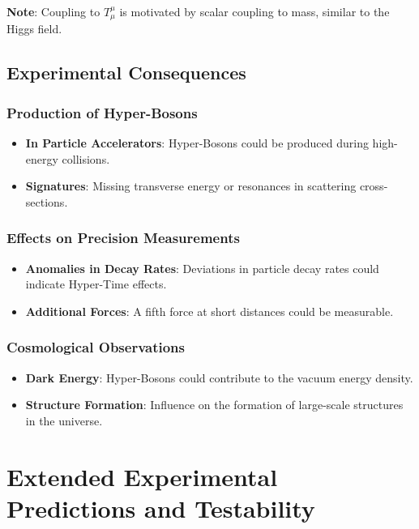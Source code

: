 \documentclass[11pt,a4paper]{article}
\begin{document}
\textbf{Note}: Coupling to $T^\mu_\mu$ is motivated by scalar coupling to mass, similar to the Higgs field.

\subsection{Experimental Consequences}

\subsubsection{Production of Hyper-Bosons}

\begin{itemize}
    \item \textbf{In Particle Accelerators}: Hyper-Bosons could be produced during high-energy collisions.
    \item \textbf{Signatures}: Missing transverse energy or resonances in scattering cross-sections.
\end{itemize}

\subsubsection{Effects on Precision Measurements}

\begin{itemize}
    \item \textbf{Anomalies in Decay Rates}: Deviations in particle decay rates could indicate Hyper-Time effects.
    \item \textbf{Additional Forces}: A fifth force at short distances could be measurable.
\end{itemize}

\subsubsection{Cosmological Observations}

\begin{itemize}
    \item \textbf{Dark Energy}: Hyper-Bosons could contribute to the vacuum energy density.
    \item \textbf{Structure Formation}: Influence on the formation of large-scale structures in the universe.
\end{itemize}

\section{Extended Experimental Predictions and Testability}
\end{document}
